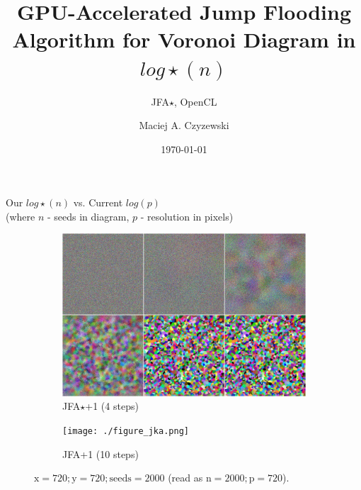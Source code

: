 \documentclass[aspectratio=169, 22pt]{beamer}
\title{GPU-Accelerated Jump Flooding Algorithm for Voronoi Diagram in $log\star(n)$}
\subtitle{JFA$\star$, OpenCL}
\date{\today}
\author[M.A.C.]{Maciej A. Czyzewski}
\begin{document}

\begin{frame}
  \titlepage{}
\end{frame}


\begin{frame}{Our $log\star(n)$ vs. Current $log(p)$ \\
	(where $n$ - seeds in
	diagram, $p$ - resolution in
	pixels)}

\begin{figure}
\centering
\begin{subfigure}{.5\textwidth}
  \centering
  \includegraphics[width=1\linewidth]{./figure_jka_star.png}
	\caption{JFA$\star$+1 (4 steps)}
  \label{fig:sub1}
\end{subfigure}%
\begin{subfigure}{.5\textwidth}
  \centering
  \texttt{[image: ./figure\_jka.png]}
	\caption{JFA+1 (10 steps)}
  \label{fig:sub2}
\end{subfigure}
	\caption{$\text{x}=720; \text{y}=720; \text{seeds}=2000$
	  (read as $\text{n}=2000; \text{p}=720$).}
\label{fig:test}
\end{figure}

\end{frame}

\end{document}
